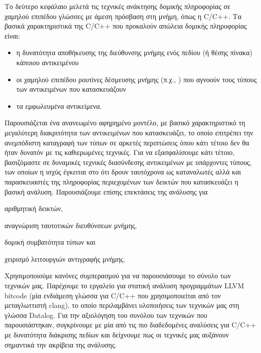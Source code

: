 Το δεύτερο κεφάλαιο μελετά τις τεχνικές ανάκτησης δομικής πληροφορίας
σε χαμηλού επιπέδου γλώσσες με άμεση πρόσβαση στη μνήμη, όπως η {\en
  C/C++}.
%
Τα βασικά χαρακτηριστικά της {\en C/C++} που προκαλούν απώλεια δομικής
πληροφορίας είναι:
\begin{itemize}[--]
\item η δυνατότητα αποθήκευσης της διεύθυνσης μνήμης ενός πεδίου (ή
  θέσης πίνακα) κάποιου αντικειμένου
\item οι χαμηλού επιπέδου ρουτίνες δέσμευσης μνήμης (π.χ., {\en
    }) που αγνοούν τους τύπους των αντικειμένων που
  κατασκευάζουν
\item τα εμφωλευμένα αντικείμενα.
\end{itemize}
%
Παρουσιάζεται ένα ανανεωμένο αφηρημένο μοντέλο, με βασικό
χαρακτηριστικό τη μεγαλύτερη διακριτότητα των αντικειμένων που
κατασκευάζει, το οποίο επιτρέπει την ανεμπόδιστη καταγραφή των τύπων
σε αρκετές περιπτώσεις όπου κάτι τέτοιο δεν θα ήταν δυνατόν με τις
καθιερωμένες τεχνικές.  Για να εξασφαλίσουμε κάτι τέτοιο, βασιζόμαστε
σε δυναμικές τεχνικές διασύνδεσης αντικειμένων με υπάρχοντες τύπους,
των οποίων η ισχύς έγκειται στο ότι δρουν ταυτόχρονα ως καταναλωτές
αλλά και παρασκευαστές της πληροφορίας περιεχομένων των δεικτών που
κατασκευάζει η βασική ανάλυση. Παρουσιάζουμε επίσης επεκτάσεις της
ανάλυσης για
\begin{inparaenum}[(1)]
\item αριθμητική δεικτών,
\item αναγνώριση ταυτοτικών διευθύνσεων μνήμης,
\item δομική συμβατότητα τύπων και
\item χειρισμό λειτουργιών αντιγραφής μνήμης.
\end{inparaenum}
Χρησιμοποιούμε κανόνες συμπερασμού για να παρουσιάσουμε το σύνολο των
τεχνικών μας. Παρέχουμε το εργαλείο {\en \cclyzer{}} για στατική
ανάλυση προγραμμάτων {\en LLVM bitcode} (μία ενδιάμεση γλώσσα για {\en
  C/C++} που χρησιμοποιείται από τον μεταγλωττιστή {\en clang}), το
οποίο περιλαμβάνει υλοποιήσεις των τεχνικών μας στη γλώσσα {\en
  Datalog}.
%
Για την αξιολόγηση του συνόλου των τεχνικών που παρουσιάστηκαν,
συγκρίνουμε με μία από τις πιο διαδεδομένες αναλύσεις για {\en C/C++}
με δυνατότητα διάκρισης πεδίων
\cite{paste/PearceKH04,toplas/PearceKH07} και δείχνουμε πως οι
τεχνικές μας αυξάνουν σημαντικά την ακρίβεια της ανάλυσης.



